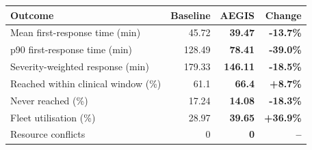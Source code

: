 \begin{tabular}{@{}lrrr@{}}
\toprule
Outcome & Baseline & \textbf{AEGIS} & Change \\
\midrule
Mean first-response time (min) & 45.72 & \textbf{39.47} & \textcolor{good}{\textbf{-13.7\%}} \\
p90 first-response time (min) & 128.49 & \textbf{78.41} & \textcolor{good}{\textbf{-39.0\%}} \\
Severity-weighted response (min) & 179.33 & \textbf{146.11} & \textcolor{good}{\textbf{-18.5\%}} \\
Reached within clinical window (\%) & 61.1 & \textbf{66.4} & \textcolor{good}{\textbf{+8.7\%}} \\
Never reached (\%) & 17.24 & \textbf{14.08} & \textcolor{good}{\textbf{-18.3\%}} \\
Fleet utilisation (\%) & 28.97 & \textbf{39.65} & \textcolor{good}{\textbf{+36.9\%}} \\
\midrule
Resource conflicts & 0 & \textbf{0} & \textcolor{good}{\textbf{--}} \\
\bottomrule
\end{tabular}